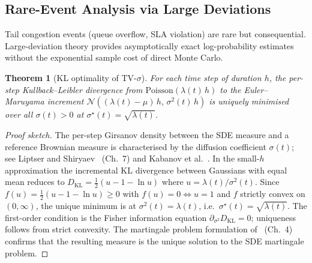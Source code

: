 \documentclass{ieeeaccess}
\newtheorem{theorem}{Theorem}
\begin{document}
\subsection{Rare-Event Analysis via Large Deviations}
\label{subsec:rare_event}

Tail congestion events (queue overflow, SLA violation) are rare but consequential.
Large-deviation theory provides asymptotically exact log-probability estimates without
the exponential sample cost of direct Monte Carlo.

\begin{theorem}[KL optimality of TV-$\sigma$]
\label{thm:kl_optimal}
For each time step of duration $h$, the per-step Kullback--Leibler divergence from
$\mathrm{Poisson}(\lambda(t)\,h)$ to the Euler--Maruyama increment
$\mathcal{N}((\lambda(t){-}\mu)\,h,\,\sigma^2(t)\,h)$ is uniquely minimised over all
$\sigma(t) > 0$ at $\sigma^{\star}(t) = \sqrt{\lambda(t)}$.
\end{theorem}
\begin{proof}[Proof sketch]
The per-step Girsanov density between the SDE measure and a reference Brownian measure
is characterised by the diffusion coefficient $\sigma(t)$; see Liptser and
Shiryaev~\cite{liptser2001statistics} (Ch.~7) and Kabanov et al.~\cite{kabanov1978}.
In the small-$h$ approximation the incremental KL divergence between Gaussians with
equal mean reduces to $D_{\mathrm{KL}} = \tfrac{1}{2}(u - 1 - \ln u)$ where
$u = \lambda(t)/\sigma^2(t)$.  Since $f(u) = \tfrac{1}{2}(u-1-\ln u) \ge 0$ with
$f(u)=0 \iff u=1$ and $f$ strictly convex on $(0,\infty)$, the unique minimum is at
$\sigma^2(t) = \lambda(t)$, i.e.\ $\sigma^{\star}(t) = \sqrt{\lambda(t)}$.
The first-order condition is the Fisher information equation
$\partial_{\sigma^2} D_{\mathrm{KL}} = 0$; uniqueness follows from strict convexity.
The martingale problem formulation of~\cite{ethier1986markov} (Ch.~4) confirms
that the resulting measure is the unique solution to the SDE martingale problem.
\end{proof}
\end{document}
